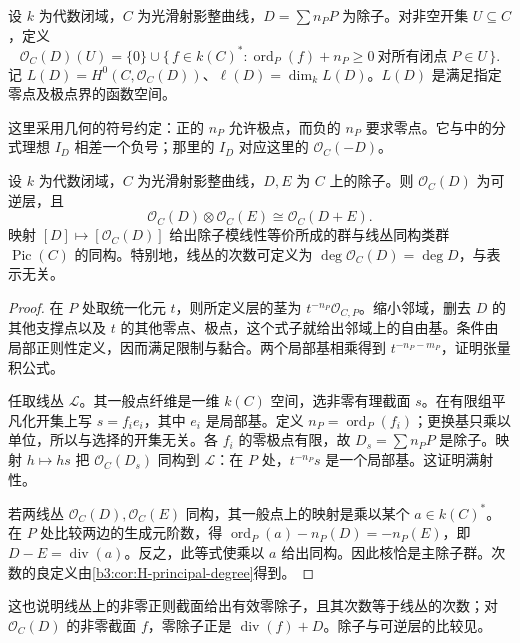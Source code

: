 \begin{definition}\label{b3:def:H-divisor-sheaf}
	设 \(k\) 为代数闭域，\(C\) 为光滑射影整曲线，\(D=\sum n_PP\) 为除子。对非空开集 \(U\subseteq C\)，定义
	\[
		\mathcal O_C(D)(U)=\{0\}\cup\{\,f\in k(C)^*: \operatorname{ord}_P(f)+n_P\ge0\ \text{对所有闭点}\;P\in U\,\}.
	\]
	记 \(L(D)=H^0(C,\mathcal O_C(D))\)、\(\ell(D)=\dim_kL(D)\)。\(L(D)\) 是满足指定零点及极点界的函数空间。
\end{definition}

这里采用几何的符号约定：正的 \(n_P\) 允许极点，而负的 \(n_P\) 要求零点。它与中的分式理想 \(I_D\) 相差一个负号；那里的 \(I_D\) 对应这里的 \(\mathcal O_C(-D)\)。

\begin{proposition}\label{b3:prop:H-divisor-line-bundle}
	设 \(k\) 为代数闭域，\(C\) 为光滑射影整曲线，\(D,E\) 为 \(C\) 上的除子。则 \(\mathcal O_C(D)\) 为可逆层，且
	\[
		\mathcal O_C(D)\otimes\mathcal O_C(E)\cong\mathcal O_C(D+E).
	\]
	映射 \([D]\mapsto[\mathcal O_C(D)]\) 给出除子模线性等价所成的群与线丛同构类群 \(\operatorname{Pic}(C)\) 的同构。特别地，线丛的次数可定义为 \(\deg\mathcal O_C(D)=\deg D\)，与表示无关。
\end{proposition}
\begin{proof}
	在 \(P\) 处取统一化元 \(t\)，则所定义层的茎为 \(t^{-n_P}\mathcal O_{C,P}\)。缩小邻域，删去 \(D\) 的其他支撑点以及 \(t\) 的其他零点、极点，这个式子就给出邻域上的自由基。条件由局部正则性定义，因而满足限制与黏合。两个局部基相乘得到 \(t^{-n_P-m_P}\)，证明张量积公式。

	任取线丛 \(\mathcal L\)。其一般点纤维是一维 \(k(C)\) 空间，选非零有理截面 \(s\)。在有限组平凡化开集上写 \(s=f_ie_i\)，其中 \(e_i\) 是局部基。定义 \(n_P=\operatorname{ord}_P(f_i)\)；更换基只乘以单位，所以与选择的开集无关。各 \(f_i\) 的零极点有限，故 \(D_s=\sum n_PP\) 是除子。映射 \(h\mapsto hs\) 把 \(\mathcal O_C(D_s)\) 同构到 \(\mathcal L\)：在 \(P\) 处，\(t^{-n_P}s\) 是一个局部基。这证明满射性。

	若两线丛 \(\mathcal O_C(D),\mathcal O_C(E)\) 同构，其一般点上的映射是乘以某个 \(a\in k(C)^*\)。在 \(P\) 处比较两边的生成元阶数，得 \(\operatorname{ord}_P(a)-n_P(D)=-n_P(E)\)，即 \(D-E=\operatorname{div}(a)\)。反之，此等式使乘以 \(a\) 给出同构。因此核恰是主除子群。次数的良定义由\cref{b3:cor:H-principal-degree}得到。
\end{proof}

这也说明线丛上的非零正则截面给出有效零除子，且其次数等于线丛的次数；对 \(\mathcal O_C(D)\) 的非零截面 \(f\)，零除子正是 \(\operatorname{div}(f)+D\)。除子与可逆层的比较见\cite[Chapter II, Proposition 6.13, Proposition 6.15 and Corollary 6.16, pp. 144--145]{Hartshorne1977}。

